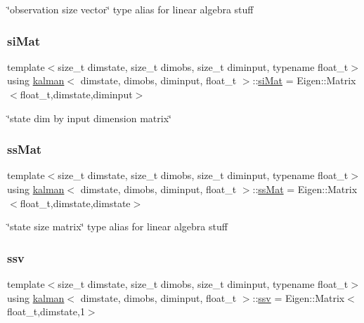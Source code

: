 \char`\"{}observation size vector\char`\"{} type alias for linear algebra stuff \mbox{\label{classkalman_ab024c795f585385ee14aea92a5dccfbc}} 
\subsubsection{\texorpdfstring{si\+Mat}{siMat}}
{\footnotesize\ttfamily template$<$size\+\_\+t dimstate, size\+\_\+t dimobs, size\+\_\+t diminput, typename float\+\_\+t$>$ \\
using \hyperlink{classkalman}{kalman}$<$ dimstate, dimobs, diminput, float\+\_\+t $>$\+::\hyperlink{classkalman_ab024c795f585385ee14aea92a5dccfbc}{si\+Mat} =  Eigen\+::\+Matrix$<$float\+\_\+t,dimstate,diminput$>$}

\char`\"{}state dim by input dimension matrix\char`\"{} \mbox{\label{classkalman_a581550d9aba33245fb496b22a834831c}} 
\subsubsection{\texorpdfstring{ss\+Mat}{ssMat}}
{\footnotesize\ttfamily template$<$size\+\_\+t dimstate, size\+\_\+t dimobs, size\+\_\+t diminput, typename float\+\_\+t$>$ \\
using \hyperlink{classkalman}{kalman}$<$ dimstate, dimobs, diminput, float\+\_\+t $>$\+::\hyperlink{classkalman_a581550d9aba33245fb496b22a834831c}{ss\+Mat} =  Eigen\+::\+Matrix$<$float\+\_\+t,dimstate,dimstate$>$}

\char`\"{}state size matrix\char`\"{} type alias for linear algebra stuff \mbox{\label{classkalman_a732cf05b5ddd106cfdafc324d03f756e}} 
\subsubsection{\texorpdfstring{ssv}{ssv}}
{\footnotesize\ttfamily template$<$size\+\_\+t dimstate, size\+\_\+t dimobs, size\+\_\+t diminput, typename float\+\_\+t$>$ \\
using \hyperlink{classkalman}{kalman}$<$ dimstate, dimobs, diminput, float\+\_\+t $>$\+::\hyperlink{classkalman_a732cf05b5ddd106cfdafc324d03f756e}{ssv} =  Eigen\+::\+Matrix$<$float\+\_\+t,dimstate,1$>$}

